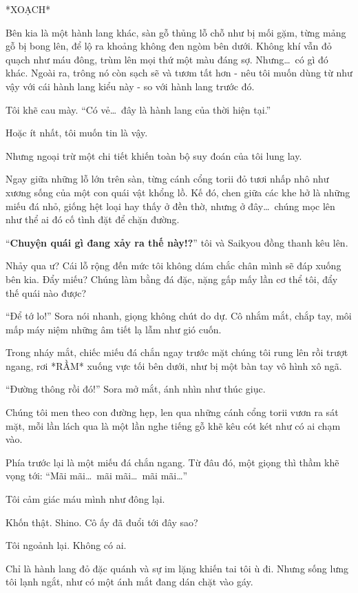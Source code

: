 \documentclass[../main.tex]{subfiles}
\begin{document}
*XOẠCH*

Bên kia là một hành lang khác, sàn gỗ thủng lỗ chỗ như bị mối gặm, từng mảng gỗ bị bong lên, để lộ ra khoảng không đen ngòm bên dưới. Không khí vẫn đỏ quạch như máu đông, trùm lên mọi thứ một màu đáng sợ. Nhưng\dots\ có gì đó khác. Ngoài ra, trông nó còn sạch sẽ và tươm tất hơn - nêu tôi muốn dùng từ như vậy với cái hành lang kiểu này - so với hành lang trước đó.


Tôi khẽ cau mày. ``Có vẻ\dots\ đây là hành lang của thời hiện tại.''

Hoặc ít nhất, tôi muốn tin là vậy.

Nhưng ngoại trừ một chi tiết khiến toàn bộ suy đoán của tôi lung lay.

Ngay giữa những lỗ lớn trên sàn, từng cánh cổng torii đỏ tươi nhấp nhô như xương sống của một con quái vật khổng lồ. Kế đó, chen giữa các khe hở là những miếu đá nhỏ, giống hệt loại hay thấy ở đền thờ, nhưng ở đây\dots\ chúng mọc lên như thể ai đó cố tình đặt để chặn đường.

``\textbf{Chuyện quái gì đang xảy ra thế này!?}'' tôi và Saikyou đồng thanh kêu lên.

Nhảy qua ư? Cái lỗ rộng đến mức tôi không dám chắc chân mình sẽ đáp xuống bên kia. Đẩy miếu? Chúng làm bằng đá đặc, nặng gấp mấy lần cơ thể tôi, đẩy thế quái nào được?

``Để tớ lo!'' Sora nói nhanh, giọng không chút do dự.
Cô nhắm mắt, chắp tay, môi mấp máy niệm những âm tiết lạ lẫm như gió cuốn.

Trong nháy mắt, chiếc miếu đá chắn ngay trước mặt chúng tôi rung lên rồi trượt ngang, rơi *RẦM* xuống vực tối bên dưới, như bị một bàn tay vô hình xô ngã.

``Đường thông rồi đó!'' Sora mở mắt, ánh nhìn như thúc giục.

Chúng tôi men theo con đường hẹp, len qua những cánh cổng torii vươn ra sát mặt, mỗi lần lách qua là một lần nghe tiếng gỗ khẽ kêu cót két như có ai chạm vào.

Phía trước lại là một miếu đá chắn ngang. Từ đâu đó, một giọng thì thầm khẽ vọng tới: ``Mãi mãi\dots\ mãi mãi\dots\ mãi mãi\dots''

Tôi cảm giác máu mình như đông lại.

Khốn thật. Shino. Cô ấy đã đuổi tới đây sao?

Tôi ngoảnh lại. Không có ai.

Chỉ là hành lang đỏ đặc quánh và sự im lặng khiến tai tôi ù đi. Nhưng sống lưng tôi lạnh ngắt, như có một ánh mắt đang dán chặt vào gáy.
\end{document}
